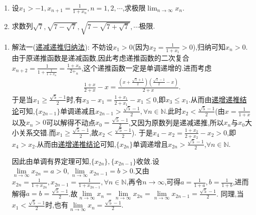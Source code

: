 \documentclass[../../main.tex]{subfiles}%
\begin{document}
\begin{example}
\begin{enumerate}
\item 设\(x_1 > - 1,x_{n + 1} = \frac{1}{1 + x_n},n = 1,2,\cdots\),求极限\(\lim_{n \to \infty} x_n\).
\item 求数列\(\sqrt{7},\sqrt{7 - \sqrt{7}},\sqrt{7 - \sqrt{7 + \sqrt{7}}},\cdots\)极限.
\end{enumerate}
\end{example}
\begin{solution}
\begin{enumerate}
\item 
{\color{blue}解法一(\hyperref[proposition:递减函数递推数列]{递减递推归纳法}):}
不妨设$x_1>0$(因为$x_2=\frac{1}{1+x_1}>0$),归纳可知$x_n>0$.由于原递推函数是递减函数,因此考虑递推函数的二次复合$x_{n+2}=\frac{1}{1+\frac{1}{1+x_n}}=\frac{1+x_n}{2+_n}$,这个递推函数一定是单调递增的.进而考虑
\begin{align*}
\frac{1+x}{2+x}-x=\frac{\left( x+\frac{\sqrt{5}+1}{2} \right) \left( \frac{\sqrt{5}-1}{2}-x \right)}{2+x}.
\end{align*}
于是当$x_1\geqslant  \frac{\sqrt{5}-1}{2}$时,有$x_3-x_1=\frac{1+x_1}{2+x_1}-x_1\leqslant 0$,即$x_3\leqslant x_1$.从而由\hyperref[proposition:递增函数递推数列]{递增递推结论}可知,$\{x_{2n-1}\}$单调递减且$x_{2n-1}>\frac{\sqrt{5}-1}{2},\forall n \in \mathbb{N}$.此时\(x_2<\frac{\sqrt{5}-1}{2}\)(由\(x = \frac{1}{1 + x}\)以及$x_n>0$可以解得不动点\(x_0=\frac{\sqrt{5}-1}{2}\),又因为原数列是递减递推,所以\(x_n\)与\(x_0\)大小关系交错.而\(x_1\geqslant\frac{\sqrt{5}-1}{2}\),故\(x_2<\frac{\sqrt{5}-1}{2}\)).
于是\(x_4 - x_2=\frac{1 + x_2}{2 + x_2}-x_2>0\),即\(x_4>x_2\).从而由\hyperref[proposition:递增函数递推数列]{递增递推结论}可知,\(\{x_{2n}\}\)单调递增且\(x_{2n}>\frac{\sqrt{5}-1}{2}\),\(\forall n\in\mathbb{N}\).

因此由单调有界定理可知,$\{x_{2n}\},\{x_{2n-1}\}$收敛.设$\underset{n\rightarrow \infty}{\lim}x_{2n}=a>0,\underset{n\rightarrow \infty}{\lim}x_{2n-1}=b>0$.又由$x_{2n}=\frac{1}{1+x_{2n}},x_{2n-1}=\frac{1}{1+x_{2n-1}},\forall n\in \mathbb{N}$,再令$n\to \infty$,可得$a=\frac{1}{1+a},b=\frac{1}{1+b}$,进而解得$a=b=\frac{\sqrt{5}-1}{2}$.故$\underset{n\rightarrow \infty}{\lim}x_n=\underset{n\rightarrow \infty}{\lim}x_{2n}=\underset{n\rightarrow \infty}{\lim}x_{2n-1}=\frac{\sqrt{5}-1}{2}$.
同理,当$x_1<\frac{\sqrt{5}-1}{2}$时,也有$\underset{n\rightarrow \infty}{\lim}x_n=\frac{\sqrt{5}-1}{2}$.


\end{enumerate}
\end{solution}
\end{document}
